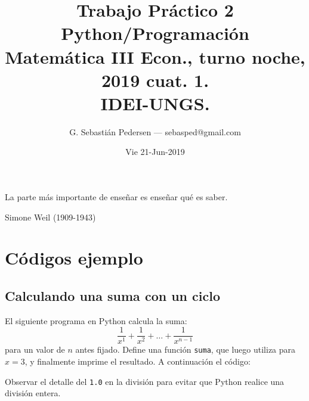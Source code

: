 \documentclass[a4paper,12pt]{article}
\title{Trabajo Práctico 2 Python/Programación\\ Matemática III Econ., turno noche, 2019 cuat. 1.\\ IDEI-UNGS.}
\author{G. Sebastián Pedersen --- sebasped@gmail.com}
\date{Vie 21-Jun-2019}
\begin{document}
\maketitle
\epigraph{La parte más importante de enseñar es enseñar qué es saber.}{Simone Weil (1909-1943)}	
\section{Códigos ejemplo}
\subsection{Calculando una suma con un ciclo}
\label{subsec:codEj1}
El siguiente programa en Python calcula la suma: $$\frac{1}{x^1} + \frac{1}{x^2} + \dots + \frac{1}{x^{n-1}}$$ para un valor de $n$ antes fijado. Define una función \verb|suma|, que luego utiliza para $x=3$, y finalmente imprime el resultado. A continuación el código:


Observar el detalle del \verb|1.0| en la división para evitar que Python realice una división entera.
%
%
\end{document}
